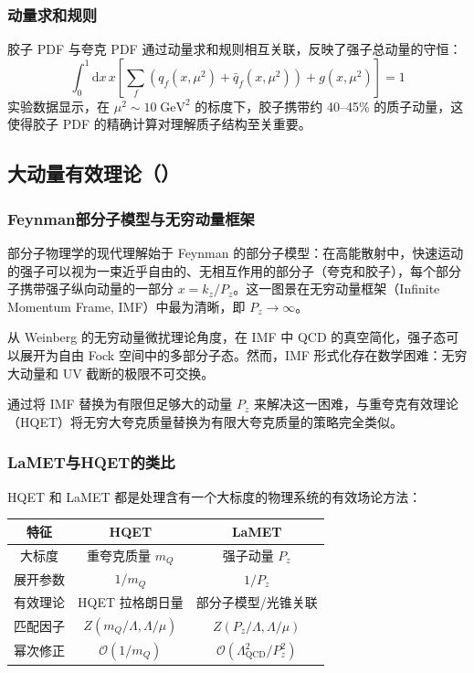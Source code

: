 \documentclass[11pt,a4paper]{ctexart}
\newcommand{\LaMET}{\text{LaMET}}
\newcommand{\order}[1]{\mathcal{O}(#1)}
\begin{document}
\subsubsection{动量求和规则}

胶子 PDF 与夸克 PDF 通过动量求和规则相互关联，反映了强子总动量的守恒：
\begin{equation}
\int_{0}^{1} \mathrm{d}x \, x \left[ \sum_{f} (q_f(x,\mu^2) + \bar{q}_f(x,\mu^2)) + g(x,\mu^2) \right] = 1
\end{equation}
实验数据显示，在 $\mu^2 \sim 10\;\text{GeV}^2$ 的标度下，胶子携带约 40--45\% 的质子动量，这使得胶子 PDF 的精确计算对理解质子结构至关重要。

\subsection{大动量有效理论（\LaMET）}

\subsubsection{Feynman部分子模型与无穷动量框架}

部分子物理学的现代理解始于 Feynman 的部分子模型：在高能散射中，快速运动的强子可以视为一束近乎自由的、无相互作用的部分子（夸克和胶子），每个部分子携带强子纵向动量的一部分 $x = k_z/P_z$。这一图景在无穷动量框架（Infinite Momentum Frame, IMF）中最为清晰，即 $P_z \to \infty$。

从 Weinberg 的无穷动量微扰理论角度，在 IMF 中 QCD 的真空简化，强子态可以展开为自由 Fock 空间中的多部分子态。然而，IMF 形式化存在数学困难：无穷大动量和 UV 截断的极限不可交换。

\LaMET{} 通过将 IMF 替换为有限但足够大的动量 $P_z$ 来解决这一困难，与重夸克有效理论（HQET）将无穷大夸克质量替换为有限大夸克质量的策略完全类似。

\subsubsection{LaMET与HQET的类比}

HQET 和 LaMET 都是处理含有一个大标度的物理系统的有效场论方法：
\begin{center}
\begin{tabular}{c|c|c}
\toprule
\textbf{特征} & \textbf{HQET} & \textbf{LaMET} \\
\midrule
大标度 & 重夸克质量 $m_Q$ & 强子动量 $P_z$ \\
展开参数 & $1/m_Q$ & $1/P_z$ \\
有效理论 & HQET 拉格朗日量 & 部分子模型/光锥关联 \\
匹配因子 & $Z(m_Q/\Lambda, \Lambda/\mu)$ & $Z(P_z/\Lambda, \Lambda/\mu)$ \\
幂次修正 & $\order{1/m_Q}$ & $\order{\Lambda_{\text{QCD}}^2/P_z^2}$ \\
\bottomrule
\end{tabular}
\end{center}
\end{document}
